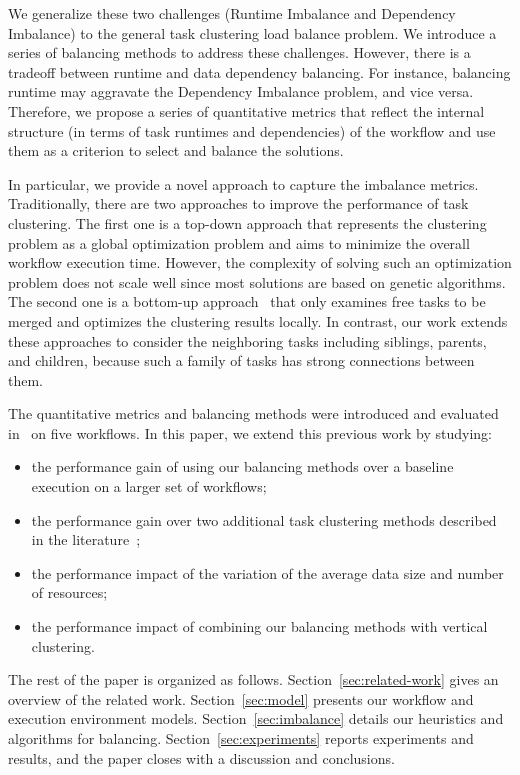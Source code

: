 We generalize these two challenges (Runtime Imbalance and Dependency Imbalance) to the general task clustering load balance problem. We introduce a series of balancing methods to address these challenges. However, there is a tradeoff between runtime and data dependency balancing. For instance, balancing runtime may aggravate the Dependency Imbalance problem, and vice versa. Therefore, we propose a series of quantitative metrics that reflect the internal structure (in terms of task runtimes and dependencies) of the workflow and use them as a criterion to select and balance {the } solutions.

In particular, we provide a novel approach to capture {the imbalance } metrics. Traditionally, there are two approaches to improve the performance of task clustering. The first one is a top-down approach \cite{6217508} that represents the clustering problem as a global optimization problem and aims to minimize the overall workflow execution time. However, the complexity of solving such an optimization problem does not scale well since most solutions are based on genetic algorithms. The second one is a bottom-up approach~\cite{Muthuvelu:2005:DJG:1082290.1082297,Liu2009} that only examines free tasks to be merged and optimizes the clustering results locally. In contrast, our work extends these approaches to consider the neighboring tasks including siblings, parents, and children{, } because such a family of tasks has strong connections between them. 

The quantitative metrics and balancing methods were introduced and evaluated in~\cite{6683907} on {five }workflows. In this {paper}, we extend this previous work by studying:

\begin{itemize}[noitemsep,nolistsep]
	\item the performance gain of using our balancing methods over a baseline execution on a larger set of workflows;
	\item the performance gain over two additional task clustering methods described in the literature~\cite{ang-2009,Liu2009};
	\item the performance impact of the variation of the average data size and number of resources;
	\item the performance impact of combining our balancing methods with vertical clustering.
\end{itemize}

The rest of {the paper } is organized as follows. Section~\ref{sec:related-work} gives an overview of the related work. Section~\ref{sec:model} presents our workflow and execution environment models. Section~\ref{sec:imbalance} details our heuristics and algorithms for balancing. Section~\ref{sec:experiments} reports experiments and results, and the {paper } closes with a discussion and conclusions.

